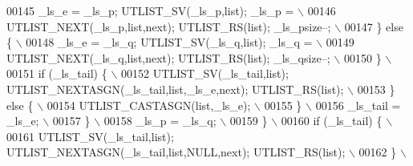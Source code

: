 \begin{DoxyCode}
00145 \textcolor{preprocessor}{            \_ls\_e = \_ls\_p; UTLIST\_SV(\_ls\_p,list); \_ls\_p =                                      \(\backslash\)}
00146 \textcolor{preprocessor}{              UTLIST\_NEXT(\_ls\_p,list,next); UTLIST\_RS(list); \_ls\_psize--;                      \(\backslash\)}
00147 \textcolor{preprocessor}{          \} else \{                                                                             \(\backslash\)}
00148 \textcolor{preprocessor}{            \_ls\_e = \_ls\_q; UTLIST\_SV(\_ls\_q,list); \_ls\_q =                                      \(\backslash\)}
00149 \textcolor{preprocessor}{              UTLIST\_NEXT(\_ls\_q,list,next); UTLIST\_RS(list); \_ls\_qsize--;                      \(\backslash\)}
00150 \textcolor{preprocessor}{          \}                                                                                    \(\backslash\)}
00151 \textcolor{preprocessor}{          if (\_ls\_tail) \{                                                                      \(\backslash\)}
00152 \textcolor{preprocessor}{            UTLIST\_SV(\_ls\_tail,list); UTLIST\_NEXTASGN(\_ls\_tail,list,\_ls\_e,next); UTLIST\_RS(list); \(\backslash\)}
00153 \textcolor{preprocessor}{          \} else \{                                                                             \(\backslash\)}
00154 \textcolor{preprocessor}{            UTLIST\_CASTASGN(list,\_ls\_e);                                                       \(\backslash\)}
00155 \textcolor{preprocessor}{          \}                                                                                    \(\backslash\)}
00156 \textcolor{preprocessor}{          \_ls\_tail = \_ls\_e;                                                                    \(\backslash\)}
00157 \textcolor{preprocessor}{        \}                                                                                      \(\backslash\)}
00158 \textcolor{preprocessor}{        \_ls\_p = \_ls\_q;                                                                         \(\backslash\)}
00159 \textcolor{preprocessor}{      \}                                                                                        \(\backslash\)}
00160 \textcolor{preprocessor}{      if (\_ls\_tail) \{                                                                          \(\backslash\)}
00161 \textcolor{preprocessor}{        UTLIST\_SV(\_ls\_tail,list); UTLIST\_NEXTASGN(\_ls\_tail,list,NULL,next); UTLIST\_RS(list);   \(\backslash\)}
00162 \textcolor{preprocessor}{      \}                                                                                        \(\backslash\)}

\end{DoxyCode}
